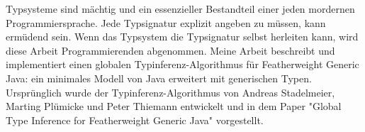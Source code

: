 Typsysteme sind mächtig und ein essenzieller Bestandteil einer jeden mordernen Programmiersprache.
Jede Typsignatur explizit angeben zu müssen, kann ermüdend sein.
Wenn das Typsystem die Typsignatur selbst herleiten kann, wird diese Arbeit Programmierenden abgenommen.
Meine Arbeit beschreibt und implementiert einen globalen Typinferenz-Algorithmus für Featherweight Generic Java: ein minimales Modell von Java erweitert mit generischen Typen.
Ursprünglich wurde der Typinferenz-Algorithmus von Andreas Stadelmeier, Marting Plümicke und Peter Thiemann entwickelt und in dem Paper "Global Type Inference for Featherweight Generic Java" vorgestellt.

